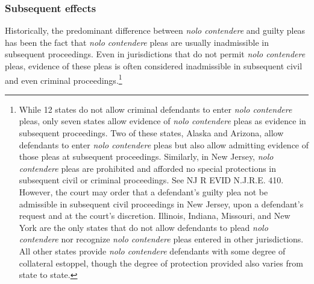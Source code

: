 \subsubsection{Subsequent effects}

Historically, the predominant difference between \textit{nolo contendere} and guilty pleas has been the fact that \textit{nolo contendere} pleas are usually inadmissible in subsequent proceedings. Even in jurisdictions that do not permit \textit{nolo contendere} pleas, evidence of these pleas is often considered inadmissible in subsequent civil and even criminal proceedings.\footnote{While 12 states do not allow criminal defendants to enter \textit{nolo contendere} pleas, only seven states allow evidence of \textit{nolo contendere} pleas as evidence in subsequent proceedings. Two of these states, Alaska and Arizona, allow defendants to enter \textit{nolo contendere} pleas but also allow admitting evidence of those pleas at subsequent proceedings. Similarly, in New Jersey, \textit{nolo contendere} pleas are prohibited and afforded no special protections in subsequent civil or criminal proceedings. See NJ R EVID N.J.R.E. 410. However, the court may order that a defendant's guilty plea not be admissible in subsequent civil proceedings in New Jersey, upon a defendant's request and at the court's discretion. Illinois, Indiana, Missouri, and New York are the only states that do not allow defendants to plead \textit{nolo contendere} nor recognize \textit{nolo contendere} pleas entered in other jurisdictions. All other states provide \textit{nolo contendere} defendants with some degree of collateral estoppel, though the degree of protection provided also varies from state to state.} 

